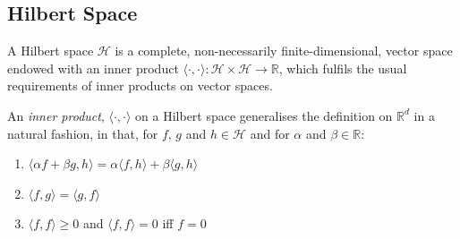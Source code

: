 \subsection{Hilbert Space}
\begin{defn}
A Hilbert space $\mathcal{H}$ is a complete, non-necessarily finite-dimensional, vector space endowed with an inner product $\langle\cdot,\cdot\rangle: \mathcal{H}\times\mathcal{H} \rightarrow\mathbb{R}$, which fulfils the usual requirements of inner products on vector spaces.
\end{defn}
\clearpage
\begin{defn}
An \emph{inner product}, $\langle\cdot,\cdot\rangle$ on a Hilbert space generalises the definition on $\mathbb{R}^d$ in a natural fashion, in that, for $f,\,g$ and $h \in \mathcal{H}$ and for $\alpha$ and $\beta \in \mathbb{R}$:
\begin{enumerate}
\item $\langle\alpha f + \beta g, h\rangle = \alpha\langle f, h\rangle + \beta\langle g, h\rangle$
\item $\langle f, g\rangle = \langle g, f \rangle$
\item $\langle f, f \rangle \ge 0$ and $\langle f, f\rangle = 0$ iff $f =0$
\end{enumerate}
\end{defn}

